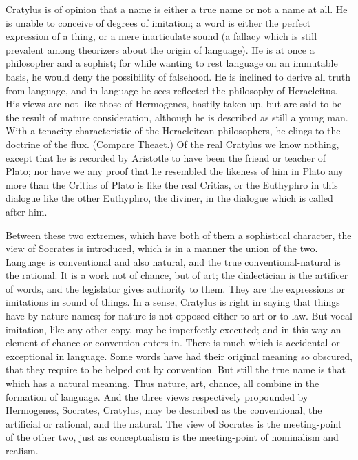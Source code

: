 \documentclass[11pt,letter]{article}
\begin{document}
\par  Cratylus is of opinion that a name is either a true name or not a name at all. He is unable to conceive of degrees of imitation; a word is either the perfect expression of a thing, or a mere inarticulate sound (a fallacy which is still prevalent among theorizers about the origin of language). He is at once a philosopher and a sophist; for while wanting to rest language on an immutable basis, he would deny the possibility of falsehood. He is inclined to derive all truth from language, and in language he sees reflected the philosophy of Heracleitus. His views are not like those of Hermogenes, hastily taken up, but are said to be the result of mature consideration, although he is described as still a young man. With a tenacity characteristic of the Heracleitean philosophers, he clings to the doctrine of the flux. (Compare Theaet.) Of the real Cratylus we know nothing, except that he is recorded by Aristotle to have been the friend or teacher of Plato; nor have we any proof that he resembled the likeness of him in Plato any more than the Critias of Plato is like the real Critias, or the Euthyphro in this dialogue like the other Euthyphro, the diviner, in the dialogue which is called after him.

\par  Between these two extremes, which have both of them a sophistical character, the view of Socrates is introduced, which is in a manner the union of the two. Language is conventional and also natural, and the true conventional-natural is the rational. It is a work not of chance, but of art; the dialectician is the artificer of words, and the legislator gives authority to them. They are the expressions or imitations in sound of things. In a sense, Cratylus is right in saying that things have by nature names; for nature is not opposed either to art or to law. But vocal imitation, like any other copy, may be imperfectly executed; and in this way an element of chance or convention enters in. There is much which is accidental or exceptional in language. Some words have had their original meaning so obscured, that they require to be helped out by convention. But still the true name is that which has a natural meaning. Thus nature, art, chance, all combine in the formation of language. And the three views respectively propounded by Hermogenes, Socrates, Cratylus, may be described as the conventional, the artificial or rational, and the natural. The view of Socrates is the meeting-point of the other two, just as conceptualism is the meeting-point of nominalism and realism.
\end{document}
